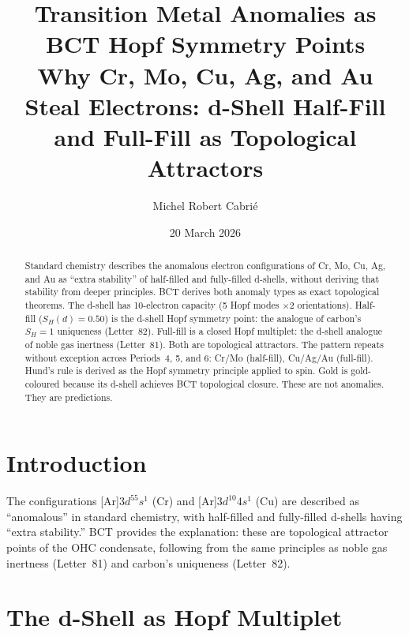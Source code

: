 \documentclass[aps,prl,twocolumn,showpacs,superscriptaddress]{revtex4-2}
\begin{document}
\title{Transition Metal Anomalies as BCT Hopf Symmetry Points\\
Why Cr, Mo, Cu, Ag, and Au Steal Electrons:
d-Shell Half-Fill and Full-Fill as Topological Attractors}

\author{Michel Robert Cabri\'e}
\date{20 March 2026}

\begin{abstract}
Standard chemistry describes the anomalous electron configurations 
of Cr, Mo, Cu, Ag, and Au as ``extra stability'' of half-filled and 
fully-filled d-shells, without deriving that stability from deeper 
principles. BCT derives both anomaly types as exact topological 
theorems. The d-shell has 10-electron capacity (5 Hopf modes 
$\times2$ orientations). Half-fill ($S_H(d)=0.50$) is the d-shell 
Hopf symmetry point: the analogue of carbon's $S_H=1$ uniqueness 
(Letter~82). Full-fill is a closed Hopf multiplet: the d-shell 
analogue of noble gas inertness (Letter~81). Both are topological 
attractors. The pattern repeats without exception across Periods~4, 
5, and 6: Cr/Mo (half-fill), Cu/Ag/Au (full-fill). Hund's rule is 
derived as the Hopf symmetry principle applied to spin. Gold is 
gold-coloured because its d-shell achieves BCT topological closure. 
These are not anomalies. They are predictions.
\end{abstract}

\maketitle

\section{Introduction}

The configurations [Ar]$3d^55s^1$ (Cr) and [Ar]$3d^{10}4s^1$ (Cu) 
are described as ``anomalous'' in standard chemistry, with half-filled 
and fully-filled d-shells having ``extra stability.'' BCT provides 
the explanation: these are topological attractor points of the OHC 
condensate, following from the same principles as noble gas inertness 
(Letter~81) and carbon's uniqueness (Letter~82).

\section{The d-Shell as Hopf Multiplet}
\end{document}
